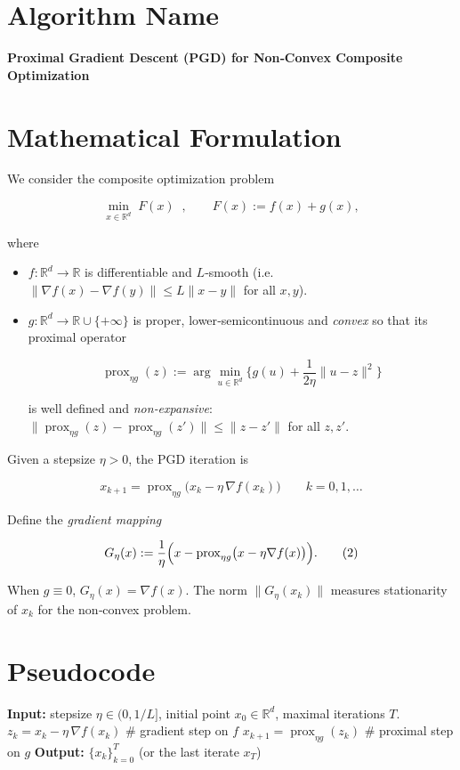 \documentclass{article}
\newcommand{\prox}{\operatorname{prox}}
\newcommand{\grad}{\nabla}
\newcommand{\R}{\mathbb{R}}
\begin{document}
\section*{Algorithm Name}
\textbf{Proximal Gradient Descent (PGD) for Non‑Convex Composite Optimization}

\section*{Mathematical Formulation}
We consider the composite optimization problem  

\[
\min_{x\in\R^{d}} \; F(x)\;\;,\qquad 
F(x):=f(x)+g(x),
\]

where  

\begin{itemize}[noitemsep]
\item $f:\R^{d}\to\R$ is differentiable and $L$‑smooth (i.e. $\|\grad f(x)-\grad f(y)\|\le L\|x-y\|$ for all $x,y$).  
\item $g:\R^{d}\to\R\cup\{+\infty\}$ is proper, lower‑semicontinuous and \emph{convex} so that its proximal operator  

\[
\prox_{\eta g}(z):=\arg\min_{u\in\R^{d}}\Big\{ g(u)+\frac{1}{2\eta}\|u-z\|^{2}\Big\}
\]

is well defined and \emph{non‑expansive}: $\|\prox_{\eta g}(z)-\prox_{\eta g}(z')\|\le\|z-z'\|$ for all $z,z'$.
\end{itemize}

Given a stepsize $\eta>0$, the PGD iteration is  

\[
\boxed{x_{k+1}= \prox_{\eta g}\bigl(x_{k}-\eta \,\grad f(x_{k})\bigr)}\qquad k=0,1,\dots
\tag{1}
\]

Define the \emph{gradient mapping}  

\[
G_{\eta}(x):=\frac{1}{\eta}\Bigl(x-\prox_{\eta g}\bigl(x-\eta \grad f(x)\bigr)\Bigr).
\tag{2}
\]

When $g\equiv0$, $G_{\eta}(x)=\grad f(x)$. The norm $\|G_{\eta}(x_{k})\|$ measures stationarity of $x_{k}$ for the non‑convex problem.

\section*{Pseudocode}
\begin{algorithm}[H]
\caption{Proximal Gradient Descent}
\begin{algorithmic}[1]
\STATE \textbf{Input:} stepsize $\eta\in(0,1/L]$, initial point $x_{0}\in\R^{d}$, maximal iterations $T$.
    \STATE $z_{k}=x_{k}-\eta\,\grad f(x_{k})$ \hfill \# gradient step on $f$
    \STATE $x_{k+1}= \prox_{\eta g}(z_{k})$ \hfill \# proximal step on $g$
\ENDFOR
\STATE \textbf{Output:} $\{x_{k}\}_{k=0}^{T}$ (or the last iterate $x_{T}$)
\end{algorithmic}
\end{algorithm}
\end{document}
